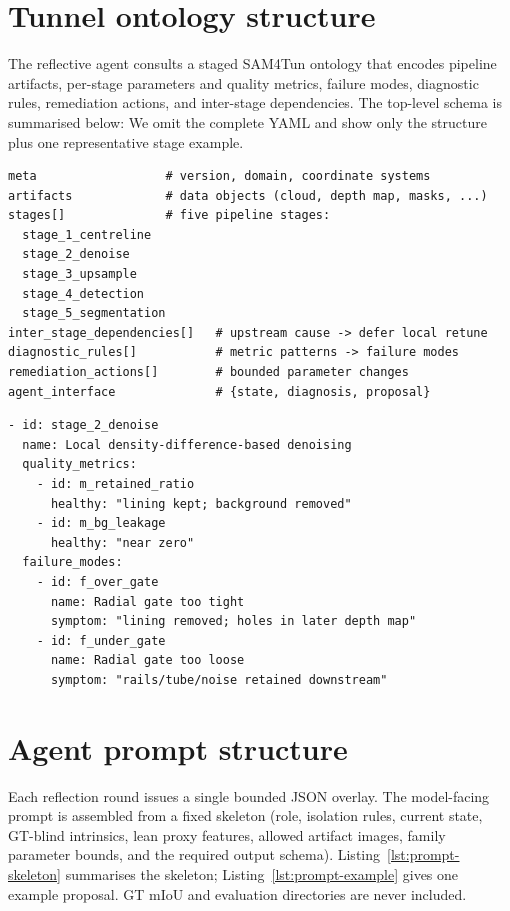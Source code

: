 \documentclass[a4paper,fleqn]{cas-dc}
\begin{document}
{\section{Tunnel ontology structure}\label{app:ontology}

The reflective agent consults a staged SAM4Tun ontology that encodes pipeline
artifacts, per-stage parameters and quality metrics, failure modes, diagnostic
rules, remediation actions, and inter-stage dependencies. The top-level schema
is summarised below:
We omit the complete YAML and show only the structure plus one representative
stage example.

\begin{lstlisting}[caption={Ontology top-level keys and stage inventory.},label={lst:ontology-structure}]
meta                  # version, domain, coordinate systems
artifacts             # data objects (cloud, depth map, masks, ...)
stages[]              # five pipeline stages:
  stage_1_centreline
  stage_2_denoise
  stage_3_upsample
  stage_4_detection
  stage_5_segmentation
inter_stage_dependencies[]   # upstream cause -> defer local retune
diagnostic_rules[]           # metric patterns -> failure modes
remediation_actions[]        # bounded parameter changes
agent_interface              # {state, diagnosis, proposal}
\end{lstlisting}

\begin{lstlisting}[caption={Example ontology stage: radial denoising failure modes.},label={lst:ontology-example}]
- id: stage_2_denoise
  name: Local density-difference-based denoising
  quality_metrics:
    - id: m_retained_ratio
      healthy: "lining kept; background removed"
    - id: m_bg_leakage
      healthy: "near zero"
  failure_modes:
    - id: f_over_gate
      name: Radial gate too tight
      symptom: "lining removed; holes in later depth map"
    - id: f_under_gate
      name: Radial gate too loose
      symptom: "rails/tube/noise retained downstream"
\end{lstlisting}

\section{Agent prompt structure}\label{app:prompt}

Each reflection round issues a single bounded JSON overlay. The model-facing
prompt is assembled from a fixed skeleton (role, isolation rules, current
state, GT-blind intrinsics, lean proxy features, allowed artifact images,
family parameter bounds, and the required output schema). Listing~\ref{lst:prompt-skeleton}
summarises the skeleton; Listing~\ref{lst:prompt-example} gives one example
proposal. GT mIoU and evaluation directories are never included.

}
\end{document}
